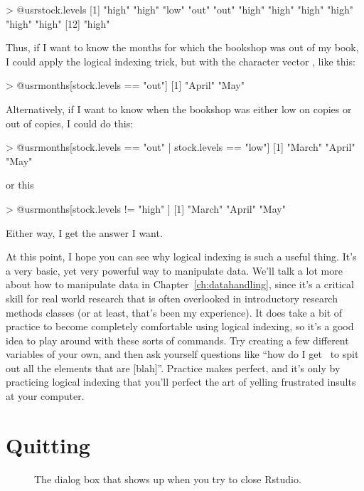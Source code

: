 \begin{rblock1}
> @usr{stock.levels}
 [1] "high" "high" "low"  "out"  "out"  "high" "high" "high" "high" "high" "high"
[12] "high"
\end{rblock1}
Thus, if I want to know the months for which the bookshop was out of my book, I could apply the logical indexing trick, but with the character vector , like this:
\begin{rblock1}
> @usr{months[stock.levels == "out"]}
[1] "April" "May"  
\end{rblock1}
Alternatively, if I want to know when the bookshop was either low on copies or out of copies, I could do this:
\begin{rblock1}
> @usr{months[stock.levels == "out" | stock.levels == "low"]}
[1] "March" "April" "May"  
\end{rblock1}
or this
\begin{rblock1}
> @usr{months[stock.levels != "high" ]}
[1] "March" "April" "May"  
\end{rblock1}
Either way, I get the answer I want.

At this point, I hope you can see why logical indexing is such a useful thing. It's a very basic, yet very powerful way to manipulate data. We'll talk a lot more about how to manipulate data in Chapter~\ref{ch:datahandling}, since it's a critical skill for real world research that is often overlooked in introductory research methods classes (or at least, that's been my experience). It does take a bit of practice to become completely comfortable using logical indexing, so it's a good idea to play around with these sorts of commands. Try creating a few different variables of your own, and then ask yourself questions like ``how do I get \R\ to spit out all the elements that are [blah]''. Practice makes perfect, and it's only by practicing logical indexing that you'll perfect the art of yelling frustrated insults at your computer.


\section{Quitting \R}


\begin{figure}[t]
\begin{center}
\caption{The dialog box that shows up when you try to close Rstudio.}
\HR
\label{fig:quitR}
\end{center}
\end{figure}


